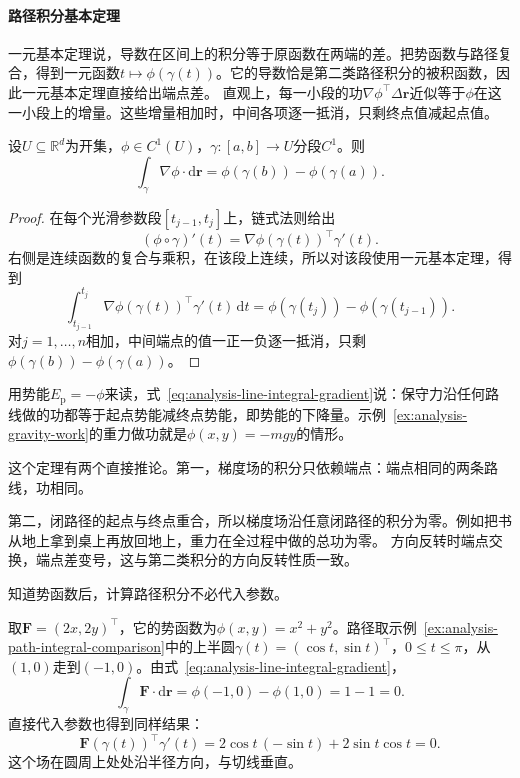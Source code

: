\paragraph{路径积分基本定理}

一元基本定理说，导数在区间上的积分等于原函数在两端的差。把势函数与路径复合，得到一元函数$t\mapsto\phi(\gamma(t))$。它的导数恰是第二类路径积分的被积函数，因此一元基本定理直接给出端点差。
直观上，每一小段的功$\nabla\phi^\top\Delta\bm r$近似等于$\phi$在这一小段上的增量。这些增量相加时，中间各项逐一抵消，只剩终点值减起点值。
\begin{theorem}[路径积分基本定理]
设$U\subseteq\mathbb R^d$为开集，$\phi\in C^1(U)$，$\gamma:[a,b]\to U$分段$C^1$。则
\begin{equation}
  \int_{\gamma}\nabla\phi\mathbin{\cdot}\mathrm{d}\bm{r}
  =\phi(\gamma(b))-\phi(\gamma(a)).
\label{eq:analysis-line-integral-gradient}
\end{equation}
\end{theorem}
\begin{proof}
在每个光滑参数段$[t_{j-1},t_j]$上，链式法则给出
\[
 (\phi\circ\gamma)'(t)=\nabla\phi(\gamma(t))^\top\gamma'(t).
\]
右侧是连续函数的复合与乘积，在该段上连续，所以对该段使用一元基本定理，得到
\[
 \int_{t_{j-1}}^{t_j}\nabla\phi(\gamma(t))^\top\gamma'(t)\,\mathrm dt=\phi(\gamma(t_j))-\phi(\gamma(t_{j-1})).
\]
对$j=1,\dots,n$相加，中间端点的值一正一负逐一抵消，只剩$\phi(\gamma(b))-\phi(\gamma(a))$。
\end{proof}

用势能$E_{\mathrm p}=-\phi$来读，式~\eqref{eq:analysis-line-integral-gradient}说：保守力沿任何路线做的功都等于起点势能减终点势能，即势能的下降量。示例~\ref{ex:analysis-gravity-work}的重力做功就是$\phi(x,y)=-mgy$的情形。

这个定理有两个直接推论。第一，梯度场的积分只依赖端点：端点相同的两条路线，功相同。

第二，闭路径的起点与终点重合，所以梯度场沿任意闭路径的积分为零。例如把书从地上拿到桌上再放回地上，重力在全过程中做的总功为零。
方向反转时端点交换，端点差变号，这与第二类积分的方向反转性质一致。

知道势函数后，计算路径积分不必代入参数。
\begin{example}[用势函数计算沿半圆的积分]
取$\bm F=(2x,2y)^\top$，它的势函数为$\phi(x,y)=x^2+y^2$。路径取示例~\ref{ex:analysis-path-integral-comparison}中的上半圆$\gamma(t)=(\cos t,\sin t)^\top$，$0\leq t\leq\pi$，从$(1,0)$走到$(-1,0)$。由式~\eqref{eq:analysis-line-integral-gradient}，
\[
 \int_\gamma\bm F\cdot\mathrm d\bm r=\phi(-1,0)-\phi(1,0)=1-1=0.
\]
直接代入参数也得到同样结果：
\[
 \bm F(\gamma(t))^\top\gamma'(t)=2\cos t\,(-\sin t)+2\sin t\cos t=0 .
\]
这个场在圆周上处处沿半径方向，与切线垂直。
\end{example}

